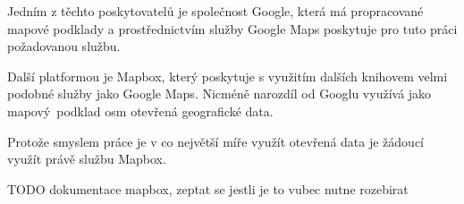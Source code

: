\bigbreak

Jedním z těchto poskytovatelů je společnost Google, která má propracované mapové podklady a prostřednictvím služby Google Maps poskytuje pro tuto práci požadovanou službu.

\bigbreak

Další platformou je Mapbox, který poskytuje s využitím dalších knihovem velmi podobné služby jako Google Maps. Nicméně narozdíl od Googlu využívá jako mapový podklad \gls{osm} {otevřená geografické data}.

\bigbreak

Protože smyslem práce je v co největší míře využít otevřená data je žádoucí využít právě službu Mapbox.

\bigbreak

TODO dokumentace mapbox, zeptat se jestli je to vubec nutne rozebirat
